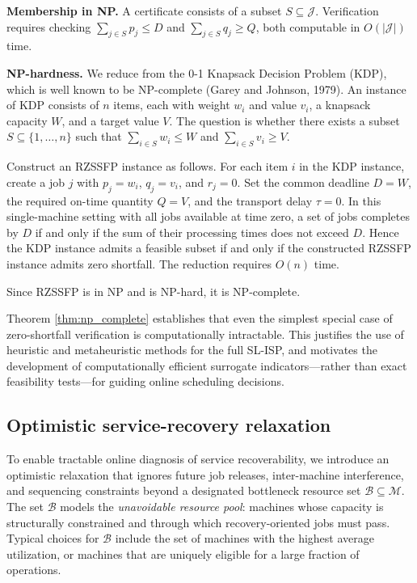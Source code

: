 \begin{pf}
\textbf{Membership in NP.} A certificate consists of a subset $S\subseteq\mathcal J$. Verification requires checking $\sum_{j\in S}p_j\le D$ and $\sum_{j\in S}q_j\ge Q$, both computable in $O(|\mathcal J|)$ time.

\medskip\noindent\textbf{NP-hardness.} We reduce from the 0-1 Knapsack Decision Problem (KDP), which is well known to be NP-complete (Garey and Johnson, 1979). An instance of KDP consists of $n$ items, each with weight $w_i$ and value $v_i$, a knapsack capacity $W$, and a target value $V$. The question is whether there exists a subset $S\subseteq\{1,\dots,n\}$ such that $\sum_{i\in S}w_i\le W$ and $\sum_{i\in S}v_i\ge V$.

Construct an RZSSFP instance as follows. For each item $i$ in the KDP instance, create a job $j$ with $p_j=w_i$, $q_j=v_i$, and $r_j=0$. Set the common deadline $D=W$, the required on-time quantity $Q=V$, and the transport delay $\tau=0$. In this single-machine setting with all jobs available at time zero, a set of jobs completes by $D$ if and only if the sum of their processing times does not exceed $D$. Hence the KDP instance admits a feasible subset if and only if the constructed RZSSFP instance admits zero shortfall. The reduction requires $O(n)$ time.

Since RZSSFP is in NP and is NP-hard, it is NP-complete.
\end{pf}

Theorem \ref{thm:np_complete} establishes that even the simplest special case of zero-shortfall verification is computationally intractable. This justifies the use of heuristic and metaheuristic methods for the full SL-ISP, and motivates the development of computationally efficient surrogate indicators---rather than exact feasibility tests---for guiding online scheduling decisions.

\subsection{Optimistic service-recovery relaxation}
\label{sec:optimistic_relaxation}

To enable tractable online diagnosis of service recoverability, we introduce an optimistic relaxation that ignores future job releases, inter-machine interference, and sequencing constraints beyond a designated bottleneck resource set $\mathcal B\subseteq\mathcal M$. The set $\mathcal B$ models the \emph{unavoidable resource pool}: machines whose capacity is structurally constrained and through which recovery-oriented jobs must pass. Typical choices for $\mathcal B$ include the set of machines with the highest average utilization, or machines that are uniquely eligible for a large fraction of operations.

